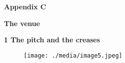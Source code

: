 \documentclass[12pt]{article}
\begin{document}
\vspace{\baselineskip}

\vspace{\baselineskip}

\vspace{\baselineskip}

\vspace{\baselineskip}

\vspace{\baselineskip}

\vspace{\baselineskip}

\vspace{\baselineskip}

\vspace{\baselineskip}

\vspace{\baselineskip}

\vspace{\baselineskip}
\begin{Center}
{\fontsize{9pt}{10.8pt}\par}
\end{Center}\par


\vspace{\baselineskip}
\begin{Center}
{\fontsize{11pt}{13.2pt}\selectfont \textbf{Appendix C}\par}
\end{Center}\par


\vspace{\baselineskip}
\begin{adjustwidth}{2.86in}{0.0in}
{\fontsize{11pt}{13.2pt}\selectfont \textbf{The venue}\par}\par

\end{adjustwidth}


\vspace{\baselineskip}
{\fontsize{16pt}{19.2pt}\selectfont \textbf{1 \tabto{0.47in} The pitch and the creases}\par}\par




\begin{figure}[H]
\advance\leftskip 0.0in		\texttt{[image: ./media/image5.jpeg]}
\end{figure}
\end{document}

